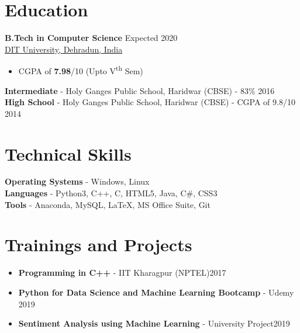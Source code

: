 \documentclass[a4paper, margin, centered]{res}
\begin{document}
\vspace{-7mm}
\begin{resume}

\section{Education}
\textbf{B.Tech in Computer Science} \hfill Expected 2020 \\
\href{http://dituniversity.edu.in/}{DIT University, Dehradun, India}
\begin{itemize}
 \item CGPA of  \textbf{7.98}/10 (Upto V\textsuperscript{th} Sem)
\end{itemize}
\textbf{Intermediate} - {Holy Ganges Public School, Haridwar} (CBSE) - 83\% \hfill 2016 \\
\textbf{High School} - {Holy Ganges Public School, Haridwar} (CBSE) -  CGPA of 9.8/10 \hfill 2014 
 

\section{Technical \hspace{2mm} Skills}
\textbf{Operating Systems} - Windows, Linux \\
\textbf{Languages} - Python3, C++, C, HTML5, Java, C\#, CSS3\\
\textbf{Tools} - Anaconda, MySQL, \LaTeX, MS Office Suite, Git


\section{Trainings \hspace{2mm} and \hspace{12mm} Projects}
\begin{itemize}[leftmargin=*]
 \item \textbf{Programming in C++} - IIT Kharagpur (NPTEL)\hfill 2017
 \item \textbf{Python for Data Science and Machine Learning Bootcamp
} - Udemy \hfill 2019
 \item \textbf{Sentiment Analysis using Machine Learning} - University Project\hfill 2019
\end{itemize}


\end{resume}
\end{document}
